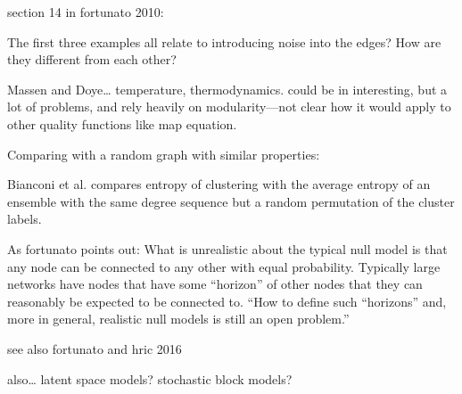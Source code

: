 section 14 in fortunato 2010:

The first three examples all relate to introducing noise into the edges?
How are they different from each other?

Massen and Doye\ldots{} temperature, thermodynamics. could be in
interesting, but a lot of problems, and rely heavily on modularity---not
clear how it would apply to other quality functions like map equation.

Comparing with a random graph with similar properties:

Bianconi et al. compares entropy of clustering with the average entropy
of an ensemble with the same degree sequence but a random permutation of
the cluster labels.

As fortunato points out: What is unrealistic about the typical null
model is that any node can be connected to any other with equal
probability. Typically large networks have nodes that have some
``horizon'' of other nodes that they can reasonably be expected to be
connected to. ``How to define such ``horizons'' and, more in general,
realistic null models is still an open problem.''

see also fortunato and hric 2016

also\ldots{} latent space models? stochastic block models?
